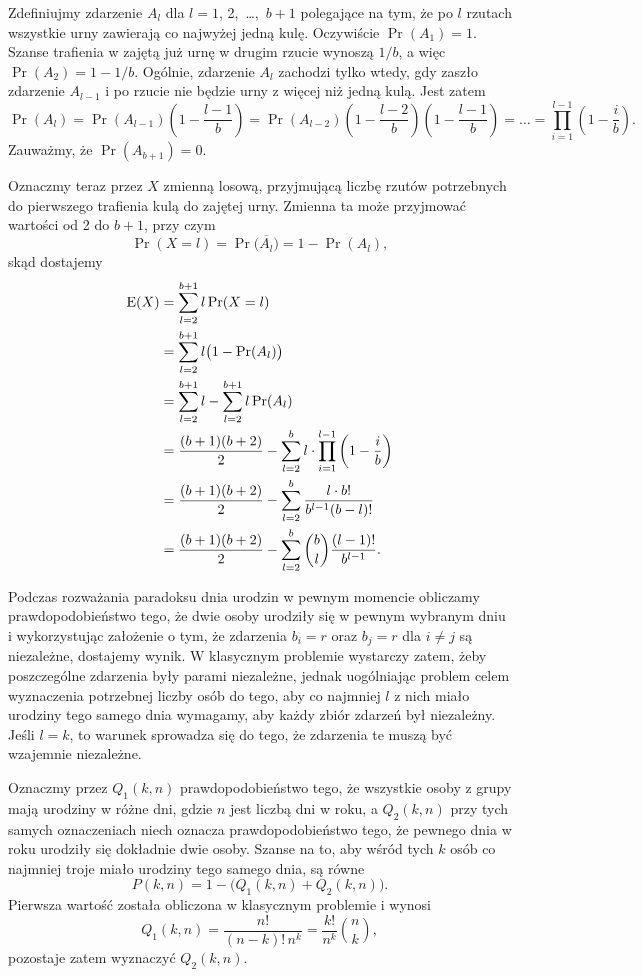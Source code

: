 \exercise %
Zdefiniujmy zdarzenie $A_l$ dla $l=1$, 2,~\dots,~$b+1$ polegające na tym, że po $l$ rzutach wszystkie urny zawierają co najwyżej jedną kulę. Oczywiście $\Pr(A_1)=1$. Szanse trafienia w zajętą już urnę w drugim rzucie wynoszą $1/b$, a więc $\Pr(A_2)=1-1/b$. Ogólnie, zdarzenie $A_l$ zachodzi tylko wtedy, gdy zaszło zdarzenie $A_{l-1}$ i po  rzucie nie będzie urny z więcej niż jedną kulą. Jest zatem
\[
	\Pr(A_l) = \Pr(A_{l-1})\left(1-\frac{l-1}{b}\right) = \Pr(A_{l-2})\left(1-\frac{l-2}{b}\right)\left(1-\frac{l-1}{b}\right) = \dots = \prod_{i=1}^{l-1}\left(1-\frac{i}{b}\right).
\]
Zauważmy, że $\Pr(A_{b+1})=0$.

Oznaczmy teraz przez $X$ zmienną losową, przyjmującą liczbę rzutów potrzebnych do pierwszego trafienia kulą do zajętej urny. Zmienna ta może przyjmować wartości od 2 do $b+1$, przy czym
\[
	\Pr(X=l) = \Pr\bigl(\overline{A_l}\bigr) = 1-\Pr(A_l),
\]
skąd \wrong dostajemy
\begin{align*}
	\operatorname{E}(X) &= \sum_{l=2}^{b+1}l\Pr(X=l) \\
	&= \sum_{l=2}^{b+1}l\bigl(1-\Pr(A_l)\bigr) \\
	&= \sum_{l=2}^{b+1}l-\sum_{l=2}^{b+1}l\Pr(A_l) \\
	&= \frac{(b+1)(b+2)}{2}-\sum_{l=2}^bl\cdot\prod_{i=1}^{l-1}\left(1-\frac{i}{b}\right) \\
	&= \frac{(b+1)(b+2)}{2}-\sum_{l=2}^b\frac{l\cdot b!}{b^{l-1}(b-l)!} \\
	&= \frac{(b+1)(b+2)}{2}-\sum_{l=2}^b\binom{b}{l}\frac{(l-1)!}{b^{l-1}}.
\end{align*}


\exercise %
Podczas rozważania paradoksu dnia urodzin w pewnym momencie obliczamy prawdopodobieństwo tego, że dwie osoby urodziły się w pewnym wybranym dniu i wykorzystując założenie o tym, że zdarzenia $b_i=r$ oraz $b_j=r$ dla $i\ne j$ są niezależne, dostajemy wynik. W klasycznym problemie wystarczy zatem, żeby poszczególne zdarzenia były parami niezależne, jednak uogólniając problem celem wyznaczenia potrzebnej liczby osób do tego, aby co najmniej $l$ z nich miało urodziny tego samego dnia wymagamy, aby każdy  zbiór zdarzeń był niezależny. Jeśli $l=k$, to warunek sprowadza się do tego, że zdarzenia te muszą być wzajemnie niezależne.

\exercise %
Oznaczmy przez $Q_1(k,n)$ prawdopodobieństwo tego, że wszystkie osoby z grupy  mają urodziny w różne dni, gdzie $n$ jest liczbą dni w roku, a $Q_2(k,n)$ przy tych samych oznaczeniach niech oznacza prawdopodobieństwo tego, że pewnego dnia w roku urodziły się dokładnie dwie osoby. Szanse na to, aby wśród tych $k$ osób co najmniej troje miało urodziny tego samego dnia, są równe
\[
    P(k,n) = 1-\bigl(Q_1(k,n)+Q_2(k,n)\bigr).
\]
Pierwsza wartość została obliczona w klasycznym problemie i wynosi
\[
    Q_1(k,n) = \frac{n!}{(n-k)!\,n^k} = \frac{k!}{n^k}\binom{n}{k},
\]
pozostaje zatem wyznaczyć $Q_2(k,n)$.

